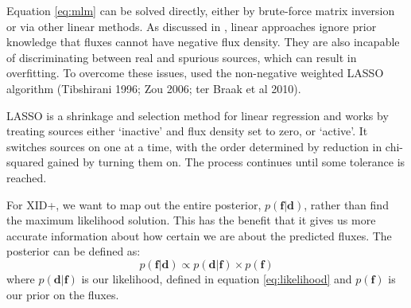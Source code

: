 \documentclass[useAMS,usenatbib]{mnras}
\begin{document}
Equation \ref{eq:mlm} can be solved directly, either by brute-force matrix inversion or via other linear methods. As discussed in \cite{Roseboom:2010, Roseboom:2011, Wang:2014}, linear approaches ignore prior knowledge that fluxes cannot have negative flux density.%
They are also incapable of discriminating between real and spurious sources, which can result in overfitting. To overcome these issues, \cite{Roseboom:2011} used the non-negative weighted LASSO algorithm (Tibshirani 1996; Zou 2006; ter Braak et al 2010).

LASSO is a shrinkage and selection method for linear regression and works by treating sources either `inactive' and flux density set to zero, or `active'. It switches sources on one at a time, with the order determined by reduction in chi-squared gained by turning them on. The process continues until some tolerance is reached.

%

For XID+, we want to map out the entire posterior, $p(\mathbf{f}|\mathbf{d})$, rather than find the maximum likelihood solution. This has the benefit that it gives us more accurate information about how certain we are about the predicted fluxes. The posterior can be defined as:
\begin{equation}
p(\mathbf{f}|\mathbf{d}) \propto p(\mathbf{d}|\mathbf{f}) \times p(\mathbf{f})
\end{equation}
where $p(\mathbf{d}|\mathbf{f})$ is our likelihood, defined in equation \ref{eq:likelihood} and $p(\mathbf{f})$ is our prior on the fluxes. 
\end{document}
